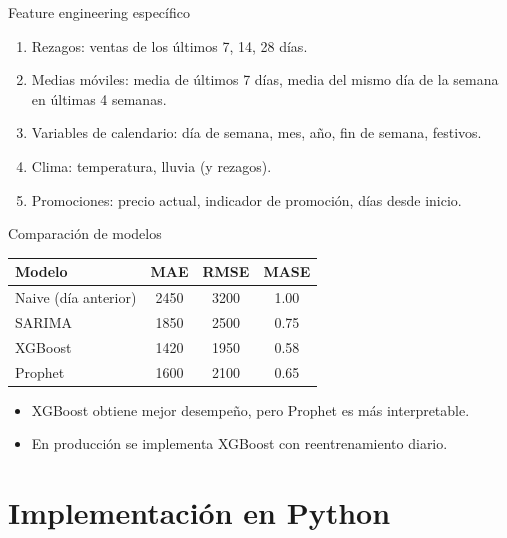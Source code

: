 \documentclass[aspectratio=169, 10pt, xcolor=table]{beamer}
\begin{document}
\begin{frame}{Feature engineering específico}
    \begin{enumerate}
        \item Rezagos: ventas de los últimos 7, 14, 28 días.
        \item Medias móviles: media de últimos 7 días, media del mismo día de la semana en últimas 4 semanas.
        \item Variables de calendario: día de semana, mes, año, fin de semana, festivos.
        \item Clima: temperatura, lluvia (y rezagos).
        \item Promociones: precio actual, indicador de promoción, días desde inicio.
    \end{enumerate}
\end{frame}

\begin{frame}{Comparación de modelos}
    \begin{table}
        \centering
        \begin{tabular}{l|c|c|c}
            \toprule
            \textbf{Modelo} & \textbf{MAE} & \textbf{RMSE} & \textbf{MASE} \\
            \midrule
            Naive (día anterior) & 2450 & 3200 & 1.00 \\
            SARIMA & 1850 & 2500 & 0.75 \\
            XGBoost & 1420 & 1950 & 0.58 \\
            Prophet & 1600 & 2100 & 0.65 \\
            \bottomrule
        \end{tabular}
    \end{table}
    \begin{itemize}
        \item XGBoost obtiene mejor desempeño, pero Prophet es más interpretable.
        \item En producción se implementa XGBoost con reentrenamiento diario.
    \end{itemize}
\end{frame}

\section{Implementación en Python}
\end{document}
